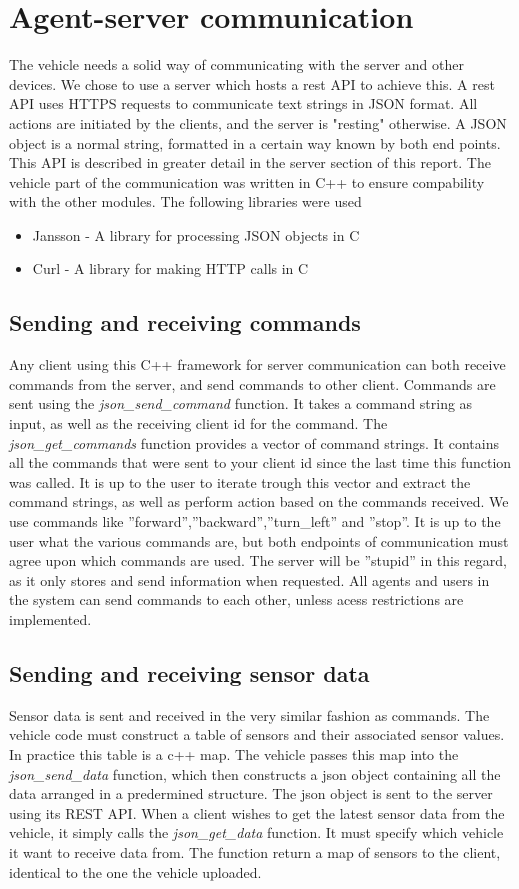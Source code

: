 \section{Agent-server communication}
The vehicle needs a solid way of communicating with the server and other devices. 
We chose to use a server which hosts a rest API to achieve this. 
A rest API uses HTTPS requests to communicate text strings in JSON format. All actions are initiated by the clients, and the server is "resting" otherwise. 
A JSON object is a normal string, formatted in a certain way known by both end points.
This API is described in greater detail in the server section of this report. The vehicle part of the communication was written in C++ to ensure compability with the other modules. The following libraries were used
\begin{itemize}
    \item Jansson - A library for processing JSON objects in C
    \item Curl - A library for making HTTP calls in C
\end{itemize}

\subsection{Sending and receiving commands}
Any client using this C++ framework for server communication can both receive commands from the server, and send commands to other client.
Commands are sent using the \textit{json\_send\_command} function. It takes a command string as input, as well as the receiving client id for the command.
The \textit{json\_get\_commands} function provides a vector of command strings. It contains all the commands that were sent to your client id since the last time this function was called. 
It is up to the user to iterate trough this vector and extract the command strings, as well as perform action based on the commands received. 
We use commands like ''forward'',''backward'',''turn\_left'' and ''stop''. It is up to the user what the various commands are, but both endpoints of communication must agree upon which commands are used. The server will be ''stupid'' in this regard, as it only stores and send information when requested. 
All agents and users in the system can send commands to each other, unless acess restrictions are implemented.

\subsection{Sending and receiving sensor data}
Sensor data is sent and received in the very similar fashion as commands.
The vehicle code must construct a table of sensors and their associated sensor values. 
In practice this table is a c++ map. 
The vehicle passes this map into the \textit{json\_send\_data} function, which then constructs a json object containing all the data arranged in a predermined structure. 
The json object is sent to the server using its REST API.
When a client wishes to get the latest sensor data from the vehicle, it simply calls the \textit{json\_get\_data} function. It must specify which vehicle it want to receive data from. The function return a map of sensors to the client, identical to the one the vehicle uploaded.

